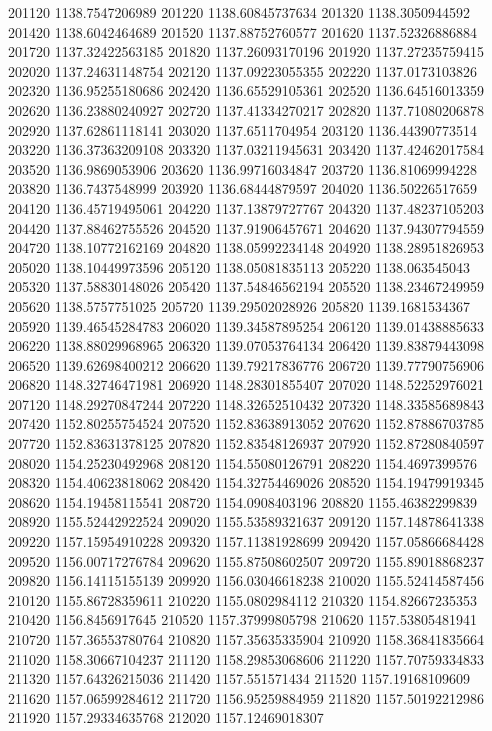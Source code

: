 {201120 1138.7547206989
201220 1138.60845737634
201320 1138.3050944592
201420 1138.6042464689
201520 1137.88752760577
201620 1137.52326886884
201720 1137.32422563185
201820 1137.26093170196
201920 1137.27235759415
202020 1137.24631148754
202120 1137.09223055355
202220 1137.0173103826
202320 1136.95255180686
202420 1136.65529105361
202520 1136.64516013359
202620 1136.23880240927
202720 1137.41334270217
202820 1137.71080206878
202920 1137.62861118141
203020 1137.6511704954
203120 1136.44390773514
203220 1136.37363209108
203320 1137.03211945631
203420 1137.42462017584
203520 1136.9869053906
203620 1136.99716034847
203720 1136.81069994228
203820 1136.7437548999
203920 1136.68444879597
204020 1136.50226517659
204120 1136.45719495061
204220 1137.13879727767
204320 1137.48237105203
204420 1137.88462755526
204520 1137.91906457671
204620 1137.94307794559
204720 1138.10772162169
204820 1138.05992234148
204920 1138.28951826953
205020 1138.10449973596
205120 1138.05081835113
205220 1138.063545043
205320 1137.58830148026
205420 1137.54846562194
205520 1138.23467249959
205620 1138.5757751025
205720 1139.29502028926
205820 1139.1681534367
205920 1139.46545284783
206020 1139.34587895254
206120 1139.01438885633
206220 1138.88029968965
206320 1139.07053764134
206420 1139.83879443098
206520 1139.62698400212
206620 1139.79217836776
206720 1139.77790756906
206820 1148.32746471981
206920 1148.28301855407
207020 1148.52252976021
207120 1148.29270847244
207220 1148.32652510432
207320 1148.33585689843
207420 1152.80255754524
207520 1152.83638913052
207620 1152.87886703785
207720 1152.83631378125
207820 1152.83548126937
207920 1152.87280840597
208020 1154.25230492968
208120 1154.55080126791
208220 1154.4697399576
208320 1154.40623818062
208420 1154.32754469026
208520 1154.19479919345
208620 1154.19458115541
208720 1154.0908403196
208820 1155.46382299839
208920 1155.52442922524
209020 1155.53589321637
209120 1157.14878641338
209220 1157.15954910228
209320 1157.11381928699
209420 1157.05866684428
209520 1156.00717276784
209620 1155.87508602507
209720 1155.89018868237
209820 1156.14115155139
209920 1156.03046618238
210020 1155.52414587456
210120 1155.86728359611
210220 1155.0802984112
210320 1154.82667235353
210420 1156.8456917645
210520 1157.37999805798
210620 1157.53805481941
210720 1157.36553780764
210820 1157.35635335904
210920 1158.36841835664
211020 1158.30667104237
211120 1158.29853068606
211220 1157.70759334833
211320 1157.64326215036
211420 1157.551571434
211520 1157.19168109609
211620 1157.06599284612
211720 1156.95259884959
211820 1157.50192212986
211920 1157.29334635768
212020 1157.12469018307
}
